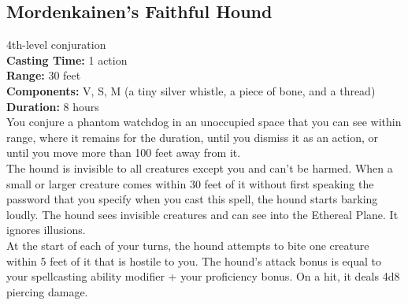 \documentclass[11pt, A4paper, english]{article}
\begin{document}
		\subsection{Mordenkainen’s Faithful Hound}
4th-level conjuration \\
\textbf{Casting Time:} 1 action \\
\textbf{Range:} 30 feet \\
\textbf{Components:} V, S, M (a tiny silver whistle, a piece of bone, and a thread) \\
\textbf{Duration:} 8 hours \\
You conjure a phantom watchdog in an unoccupied space that you can see within range, where it remains for the duration, until you dismiss it as an action, or until you move more than 100 feet away from it. \\
The hound is invisible to all creatures except you and can't be harmed. When a small or larger creature comes within 30 feet of it without first speaking the password that you specify when you cast this spell, the hound starts barking loudly. The hound sees invisible creatures and can see into the Ethereal Plane. It ignores illusions. \\
At the start of each of your turns, the hound attempts to bite one creature within 5 feet of it that is hostile to you. The hound’s attack bonus is equal to your spellcasting ability modifier + your proficiency bonus. On a hit, it deals 4d8 piercing damage.
\end{document}
